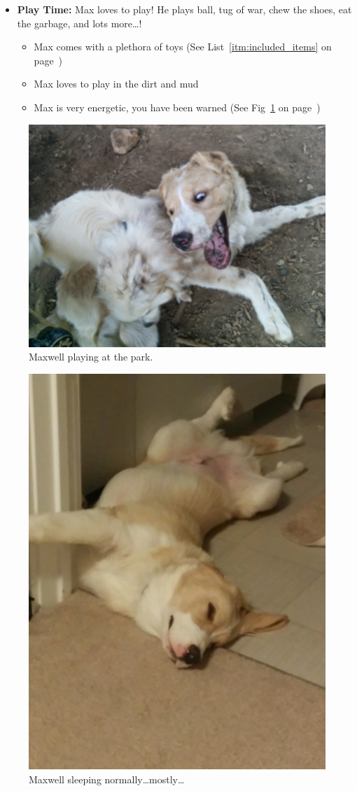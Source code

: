 \documentclass[pdftex,12pt]{article}
\begin{document}
\begin{itemize}
        once in the evening. He also receives water during each meal.
        \begin{itemize}
            \item Each meal consists of 1.5 cups of dog food
                (See Fig~\ref{fig:food_bowl_filled} on
                page~\pageref{fig:food_bowl_filled})
            \item Max is trained to wait until eating
                (See Fig~\ref{fig:food_container_open} on
                page~\pageref{fig:food_container_open})
            \item Max eats fast, and he must be walked immediately after dinner
        \end{itemize}
    \item \textbf{Play Time:} Max loves to play! He plays ball, tug of war, chew
        the shoes, eat the garbage, and lots more\ldots!
        \begin{itemize}
            \item Max comes with a plethora of toys
                (See List~\ref{itm:included_items} on
                page~\pageref{itm:included_items})
            \item Max loves to play in the dirt and mud
            \item Max is very energetic, you have been warned
                (See Fig~\ref{fig:at_the_park} on
                page~\pageref{fig:at_the_park})
        \end{itemize}
\end{itemize}

\bigskip

\begin{figure}[h!]
    \centering
    \includegraphics[width=.35\textwidth]{./images/max/at_the_park.jpg}
    \caption{Maxwell playing at the park.}
    \label{fig:at_the_park}
\end{figure}

\bigskip

\begin{figure}[h!]
    \centering
    \includegraphics[width=.35\textwidth]{./images/max/sleeping.jpg}
    \caption{Maxwell sleeping normally\ldots mostly\ldots}
    \label{fig:sleeping}
\end{figure}
\end{document}
